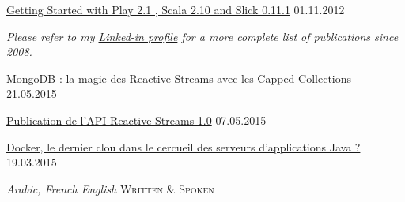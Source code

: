 \documentclass[10pt,a4paper]{article}
\begin{document}
\headedsection
  {\href{http://java.dzone.com/articles/getting-started-play-21-scala}{Getting Started with Play 2.1 , Scala 2.10 and Slick 0.11.1}}
  {\textsc{01.11.2012}}
  
\vspace{-0.2em}
\begin{center}
  \emph{\small Please refer to my \href{http://www.linkedin.com/in/ouertani}{Linked-in profile} for a more complete list of publications since 2008.}
\end{center}



\spacedhrule{0em}{-0.4em}


\headedsection
  {\href{http://www.infoq.com/fr/news/2015/05/reactive-streams-capped-collecti}{MongoDB : la magie des Reactive-Streams avec les Capped Collections}}
  {\textsc{21.05.2015}}   

\headedsection
  {\href{http://www.infoq.com/fr/news/2015/05/api-reactive-streams-1-0}{Publication de l’API Reactive Streams 1.0}}
  {\textsc{07.05.2015}} 

\headedsection
  {\href{http://www.infoq.com/fr/news/2015/03/docker-vs-serveurs-app-java}{Docker, le dernier clou dans le cercueil des serveurs d’applications Java ?}}
  {\textsc{19.03.2015}} 


\spacedhrule{0em}{-0.4em}

\headedsection
  {\sl Arabic, French English} 
  {\textsc{Written \& Spoken}} 
\end{document}
